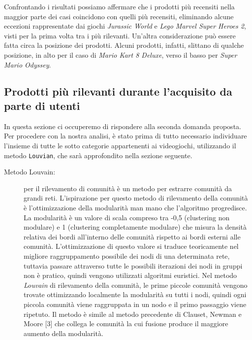 			Confrontando i risultati possiamo affermare che i prodotti più recensiti nella maggior parte dei casi coincidono con quelli più recensiti, eliminando alcune eccezioni rappresentate dai giochi \textit{Jurassic World} e \textit{Lego Marvel Super Heroes 2}, visti per la prima volta tra i più rilevanti. Un'altra considerazione può essere fatta circa la posizione dei prodotti. Alcuni prodotti, infatti, slittano di qualche posizione, in alto per il caso di \textit{Mario Kart 8 Deluxe}, verso il basso per \textit{Super Mario Odyssey}.
		
		\subsection{Prodotti più rilevanti durante l'acquisito da parte di utenti}
		\label{cap:rilevantProducts}
			In questa sezione ci occuperemo di rispondere alla seconda domanda proposta. Per procedere con la nostra analisi, è stato prima di tutto necessario individuare l'insieme di tutte le sotto categorie appartenenti ai videogiochi, utilizzando il metodo \verb|Louvian|, che sarà approfondito nella sezione seguente.
		
			\begin{description}
				\item [Metodo Louvain:] per il rilevamento di comunità è un metodo per estrarre comunità da grandi reti. L'ispirazione per questo metodo di rilevamento della comunità è l'ottimizzazione della modularità man mano che l'algoritmo progredisce. La modularità è un valore di scala compreso tra -0,5 (clustering non modulare) e 1 (clustering completamente modulare) che misura la densità relativa dei bordi all'interno delle comunità rispetto ai bordi esterni alle comunità. L'ottimizzazione di questo valore si traduce teoricamente nel migliore raggruppamento possibile dei nodi di una determinata rete, tuttavia passare attraverso tutte le possibili iterazioni dei nodi in gruppi non è pratico, quindi vengono utilizzati algoritmi euristici. Nel metodo \textit{Louvain} di rilevamento della comunità, le prime piccole comunità vengono trovate ottimizzando localmente la modularità su tutti i nodi, quindi ogni piccola comunità viene raggruppata in un nodo e il primo passaggio viene ripetuto. Il metodo è simile al metodo precedente di Clauset, Newman e Moore [3] che collega le comunità la cui fusione produce il maggiore aumento della modularità.
			\end{description}

